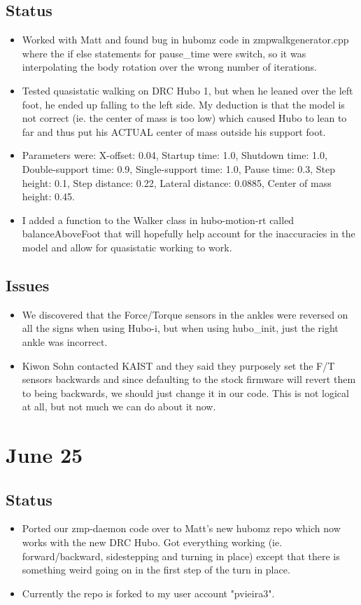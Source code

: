 \documentclass[letterpaper, 10 pt]{report}
\begin{document}
\subsection*{Status}
\begin{itemize}
\item Worked with Matt and found bug in hubomz code in zmpwalkgenerator.cpp where the if else statements for pause\_time were switch, so it was interpolating the body rotation over the wrong number of iterations.
\item Tested quasistatic walking on DRC Hubo 1, but when he leaned over the left foot, he ended up falling to the left side. My deduction is that the model is not correct (ie. the center of mass is too low) which caused Hubo to lean to far and thus put his ACTUAL center of mass outside his support foot.
\item Parameters were: X-offset: 0.04, Startup time: 1.0, Shutdown time: 1.0, Double-support time: 0.9, Single-support time: 1.0, Pause time: 0.3, Step height: 0.1, Step distance: 0.22, Lateral distance: 0.0885, Center of mass height: 0.45.
\item I added a function to the Walker class in hubo-motion-rt called balanceAboveFoot that will hopefully help account for the inaccuracies in the model and allow for quasistatic working to work.
\end{itemize}
\subsection*{Issues}
\begin{itemize}
\item We discovered that the Force/Torque sensors in the ankles were reversed on all the signs when using Hubo-i, but when using hubo\_init, just the right ankle was incorrect.
\item Kiwon Sohn contacted KAIST and they said they purposely set the F/T sensors backwards and since defaulting to the stock firmware will revert them to being backwards, we should just change it in our code. This is not logical at all, but not much we can do about it now.
\end{itemize}

\section*{June 25}
\subsection*{Status}
\begin{itemize}
\item Ported our zmp-daemon code over to Matt's new hubomz repo which now works with the new DRC Hubo. Got everything working (ie. forward/backward, sidestepping and turning in place) except that there is something weird going on in the first step of the turn in place.
\item Currently the repo is forked to my user account "pvieira3".
\end{itemize}
\end{document}
